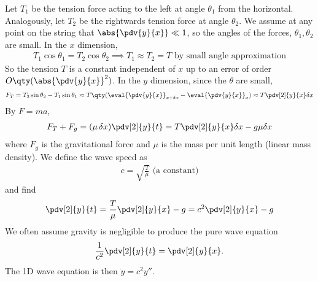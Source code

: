 Let $T_1$ be the tension force acting to the left at angle $\theta_1$ from the horizontal.
Analogously, let $T_2$ be the rightwards tension force at angle $\theta_2$.
We assume at any point on the string that $\abs{\pdv{y}{x}} \ll 1$, so the angles of the forces, $\theta_1, \theta_2$ are small.
In the $x$ dimension,
\begin{align*}
	T_1 \cos \theta_1 = T_2 \cos \theta_2 \implies T_1 \approx T_2 = T \text{ by small angle approximation}
\end{align*}
So the tension $T$ is a constant independent of $x$ up to an error of order $O\qty(\abs{\pdv{y}{x}
}^2)$.
In the $y$ dimension, since the $\theta$ are small,
\begin{align*}
	F_T = T_2 \sin \theta_2 - T_1 \sin \theta_1 \approx T \qty(\eval{\pdv{y}{x}}_{x + \delta x} - \eval{\pdv{y}{x}}_x) \approx T \pdv[2]{y}{x} \delta x
\end{align*}
By $F = ma$,
\begin{align*}
	F_T + F_g = (\mu \, \delta x) \pdv[2]{y}{t} = T \pdv[2]{y}{x} \delta x - g \mu \delta x
\end{align*}
where $F_g$ is the gravitational force and $\mu$ is the mass per unit length (linear mass density).
We define the wave speed as
\begin{align*}
	c = \sqrt{\frac{T}{\mu}} \text{ (a constant)}
\end{align*}
and find
\begin{align}
	\pdv[2]{y}{t} = \frac{T}{\mu} \pdv[2]{y}{x} - g = c^2 \pdv[2]{y}{x} - g \label{eq:3.3}
\end{align}
We often assume gravity is negligible to produce the pure wave equation
\begin{align} \label{eq:3.4}
	\frac{1}{c^2} \pdv[2]{y}{t} = \pdv[2]{y}{x}.
\end{align}
The 1D wave equation is then $\ddot{y} = c^2 y''$.

